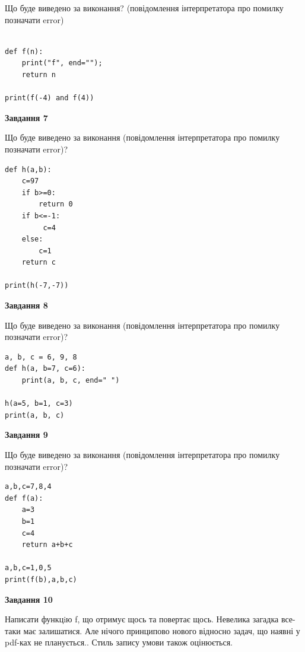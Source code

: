 \documentclass[12pt, ukrainian]{article}
\begin{document}
{\begin {large}
Що буде виведено за виконання? (повідомлення інтерпретатора про помилку позначати error)\par
\begin{verbatim}

def f(n):
    print("f", end="");
    return n

print(f(-4) and f(4))
\end{verbatim}

{\begin {center}\textbf{Завдання 7}\end {center}}

Що буде виведено за виконання (повідомлення інтерпретатора про помилку позначати error)?\par
\begin{verbatim}
def h(a,b):
    c=97
    if b>=0:
        return 0
    if b<=-1:
         c=4
    else: 
        c=1
    return c

print(h(-7,-7))
\end{verbatim}

{\begin {center}\textbf{Завдання 8}\end {center}}

Що буде виведено за виконання (повідомлення інтерпретатора про помилку позначати error)?\par
\begin{verbatim}
a, b, c = 6, 9, 8
def h(a, b=7, c=6):
    print(a, b, c, end=" ")

h(a=5, b=1, c=3)
print(a, b, c)
\end{verbatim}

{\begin {center}\textbf{Завдання 9}\end {center}}

Що буде виведено за виконання (повідомлення інтерпретатора про помилку позначати error)?\par
\begin{verbatim}
a,b,c=7,8,4
def f(a):
    a=3
    b=1
    c=4
    return a+b+c

a,b,c=1,0,5
print(f(b),a,b,c)
\end{verbatim}

{\begin {center}\textbf{Завдання 10}\end {center}}


Написати функцiю f, що отримує щось та повертає щось. Невелика загадка все-таки має залишатися. Але нічого принципово нового відносно задач, що наявні у pdf-ках не планується.. Стиль запису умови також оцінюється.\par
\end {large}}
\newpage
\end{document}
